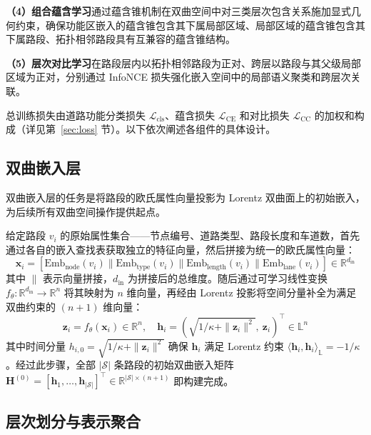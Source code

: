 \textbf{（4）组合蕴含学习}通过蕴含锥机制在双曲空间中对三类层次包含关系施加显式几何约束，确保功能区嵌入的蕴含锥包含其下属局部区域、局部区域的蕴含锥包含其下属路段、拓扑相邻路段具有互兼容的蕴含锥结构。

\textbf{（5）层次对比学习}在路段层内以拓扑相邻路段为正对、跨层以路段与其父级局部区域为正对，分别通过 InfoNCE 损失强化嵌入空间中的局部语义聚类和跨层次关联。

总训练损失由道路功能分类损失 $\mathcal{L}_{\text{cls}}$、蕴含损失 $\mathcal{L}_{\text{CE}}$ 和对比损失 $\mathcal{L}_{\text{CC}}$ 的加权和构成（详见第~\ref{sec:loss} 节）。以下依次阐述各组件的具体设计。

\subsection{双曲嵌入层}

双曲嵌入层的任务是将路段的欧氏属性向量投影为 Lorentz 双曲面上的初始嵌入，为后续所有双曲空间操作提供起点。

给定路段 $v_i$ 的原始属性集合——节点编号、道路类型、路段长度和车道数，首先通过各自的嵌入查找表获取独立的特征向量，然后拼接为统一的欧氏属性向量：
\begin{equation}
    \mathbf{x}_i = [\mathrm{Emb}_{\text{node}}(v_i) \| \mathrm{Emb}_{\text{type}}(v_i) \| \mathrm{Emb}_{\text{length}}(v_i) \| \mathrm{Emb}_{\text{lane}}(v_i)] \in \mathbb{R}^{d_{\text{in}}}
\end{equation}
其中 $\|$ 表示向量拼接，$d_{\text{in}}$ 为拼接后的总维度。随后通过可学习线性变换 $f_\theta: \mathbb{R}^{d_{\text{in}}} \to \mathbb{R}^n$ 将其映射为 $n$ 维向量，再经由 Lorentz 投影将空间分量补全为满足双曲约束的 $(n+1)$ 维向量：
\begin{equation}
    \mathbf{z}_i = f_\theta(\mathbf{x}_i) \in \mathbb{R}^n, \quad \mathbf{h}_i = \left(\sqrt{1/\kappa + \|\mathbf{z}_i\|^2},\ \mathbf{z}_i\right)^\top \in \mathbb{L}^n
\end{equation}
其中时间分量 $h_{i,0} = \sqrt{1/\kappa + \|\mathbf{z}_i\|^2}$ 确保 $\mathbf{h}_i$ 满足 Lorentz 约束 $\langle \mathbf{h}_i, \mathbf{h}_i \rangle_{\mathbb{L}} = -1/\kappa$。经过此步骤，全部 $|\mathcal{S}|$ 条路段的初始双曲嵌入矩阵 $\mathbf{H}^{(0)} = [\mathbf{h}_1, \ldots, \mathbf{h}_{|\mathcal{S}|}]^\top \in \mathbb{R}^{|\mathcal{S}| \times (n+1)}$ 即构建完成。

\subsection{层次划分与表示聚合}

